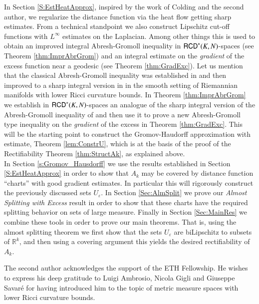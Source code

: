 \documentclass[11pt,reqno]{amsart}
\newcommand{\R}{\mathbb{R}}
\newcommand{\RCD}{{\sf RCD}}
\theoremstyle{definition}
\theoremstyle{remark}
\theoremstyle{remark}
\theoremstyle{remark}
\theoremstyle{remark}
\theoremstyle{remark}
\theoremstyle{remark}
\theoremstyle{remark}
\begin{document}
In Section \ref{S:EstHeatApprox}, inspired by the work  \cite{CN} of Colding and the second author, we regularize the distance function via the heat flow getting sharp estimates.  From a technical standpoint we also construct Lipschitz cut-off functions with $L^\infty$ estimates on the Laplacian.  Among other things this is used to obtain an improved integral Abresh-Gromoll inequality in $\RCD^*(K,N)$-spaces (see Theorem \ref{thm:ImprAbrGrom}) and an integral estimate on the \emph{gradient} of the excess function near a geodesic (see Theorem \ref{thm:GradExc}). Let us mention that the classical Abresh-Gromoll inequality was established in \cite{AG90} and then improved  to a sharp integral version in \cite{CN} in the smooth setting of Riemannian manifolds with lower Ricci curvature bounds.  In Theorem \ref{thm:ImprAbrGrom} we establish in $\RCD^*(K,N)$-spaces an analogue of the sharp  integral version of the Abresh-Gromoll inequality of  \cite{CN} and then use it to prove a new Abresh-Gromoll type inequality on the \emph{gradient} of the excess in Theorem \ref{thm:GradExc}.  This will be the starting point to construct the Gromov-Haudorff approximation with estimate, Theorem \ref{lem:ConstrU}, which is at the basis of the proof of the Rectifiability  Theorem \ref{thm:StructAk}, as explained above.\\

In Section \ref{s:Gromov_Hausdorff} we use the results established in Section \ref{S:EstHeatApprox} in order to show  that $A_k$ may be covered by distance function ``charts'' with good gradient estimates.  In particular this will rigorously construct the previously discussed sets $U_\varepsilon$.  In Section \ref{Sec:AlmSplit} we prove our {\it Almost Splitting with Excess} result in order to show that these charts have the required splitting behavior on sets of large measure.  Finally in Section \ref{Sec:MainRes} we combine these tools in order to prove our main theorems.  That is, using the almost splitting theorem we first show that the sets $U_\varepsilon$ are biLipschitz to subsets of $\R^k$, and then using a covering argument this yields the desired rectifiability of $A_k$.

\bigskip

  The second author acknowledges the support
of the ETH Fellowship. He  wishes to express his deep gratitude to Luigi Ambrosio, Nicola Gigli and Giuseppe Savar\'e  for having introduced him to the topic of metric measure spaces with lower Ricci curvature bounds.
\end{document}
